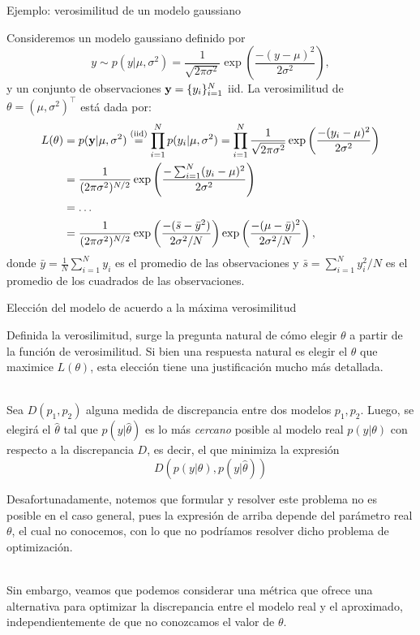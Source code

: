 \documentclass[9pt]{beamer}
\begin{document}
\begin{frame}{Ejemplo: verosimilitud de un modelo gaussiano}

Consideremos un  modelo gaussiano definido por 
\begin{equation*}
	y \sim p(y|\mu,\sigma^2) = \frac{1}{\sqrt{2\pi\sigma^2}}\exp\left(\frac{-(y-\mu)^2}{2\sigma^2}\right), \label{eq:ejemplo_gaussiano}
\end{equation*}
y un conjunto de observaciones $\mathbf{y} = \{y_i\}_{i=1}^N$ iid. \pause La verosimilitud  de $\theta  =  (\mu,\sigma^2)^\top$ está dada por:
\begin{align}
  	L(\theta)  &=  p(\mathbf{y}|\mu,\sigma^2) \stackrel{\text{(iid)}}{=}\prod_{i=1}^N p(y_i|\mu,\sigma^2) = \prod_{i=1}^N \frac{1}{\sqrt{2\pi\sigma^2}}\exp\left(\frac{-(y_i-\mu)^2}{2\sigma^2}\right)\nonumber\\ 
  				 &= \frac{1}{(2\pi\sigma^2)^{N/2}}  \exp\left(\frac{-\sum_{i=1}^N(y_i-\mu)^2}{2\sigma^2}\right)\nonumber\\
  				 &= \ldots\nonumber\\
  				 & = \frac{1}{(2\pi\sigma^2)^{N/2}}  \exp\left(\frac{-(\bar s  - \bar y^2)}{2\sigma^2/N}\right)\exp\left(\frac{-(\mu - \bar y)^2}{2\sigma^2/N}\right)
  				\nonumber,
 \end{align}  
 donde $\bar y = \tfrac{1}{N}\sum_{i=1}^Ny_i$ es el promedio de las observaciones y $\bar s = \sum_ {i=1}^Ny_i^2/N$ es el promedio de los cuadrados de las observaciones.
	
\end{frame}

\begin{frame}{Elección del modelo de acuerdo a la máxima verosimilitud}

Definida la verosilimitud, surge la pregunta natural de cómo elegir $\theta$ a partir de la función de verosimilitud. Si bien una respuesta natural es elegir el $\theta$ que maximice $L(\theta)$, esta elección tiene una justificación mucho más detallada.\\~\ \pause

Sea $D(p_1,p_2)$ alguna medida de discrepancia entre dos modelos $p_1,p_2$. Luego, se elegirá el $\hat\theta$ tal que $p(y|\hat\theta)$ es lo más \emph{cercano} posible al modelo real $p(y|\theta)$ con respecto a la discrepancia $D$, es decir, el que minimiza la expresión
\begin{equation*}
    	D(p(y|\theta),p(y|\hat\theta))
\end{equation*} \pause

Desafortunadamente, notemos que formular y resolver  este problema no es posible en el caso general, pues la expresión de arriba depende del parámetro real $\theta$, el cual no conocemos, con lo que no podríamos resolver dicho problema de optimización.\\~\

Sin embargo, veamos que podemos considerar una métrica que ofrece una alternativa para optimizar la discrepancia entre el modelo real y el aproximado, independientemente de que no conozcamos el valor de $\theta$.

\end{frame}
\end{document}
